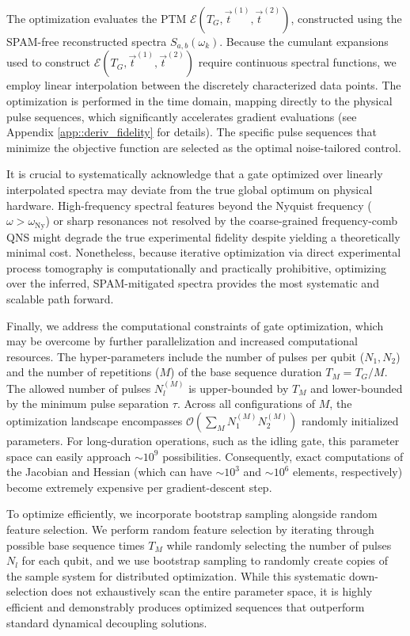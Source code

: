 \documentclass[%
 reprint,
superscriptaddress,
 amsmath,amssymb,
 aps,
pra,
floatfix,
]{revtex4-2}
\begin{document}
The optimization evaluates the PTM $\mathcal{E}(T_G, \vec{t}^{(1)}, \vec{t}^{(2)})$, constructed using the SPAM-free reconstructed spectra $S_{a,b}(\omega_k)$. Because the cumulant expansions used to construct $\mathcal{E}(T_G, \vec{t}^{(1)}, \vec{t}^{(2)})$ require continuous spectral functions, we employ linear interpolation between the discretely characterized data points. The optimization is performed in the time domain, mapping directly to the physical pulse sequences, which significantly accelerates gradient evaluations (see Appendix \ref{app::deriv_fidelity} for details). The specific pulse sequences that minimize the objective function are selected as the optimal noise-tailored control.

It is crucial to systematically acknowledge that a gate optimized over linearly interpolated spectra may deviate from the true global optimum on physical hardware. High-frequency spectral features beyond the Nyquist frequency ($\omega > \omega_{\text{Ny}}$) or sharp resonances not resolved by the coarse-grained frequency-comb QNS might degrade the true experimental fidelity despite yielding a theoretically minimal cost. Nonetheless, because iterative optimization via direct experimental process tomography is computationally and practically prohibitive, optimizing over the inferred, SPAM-mitigated spectra provides the most systematic and scalable path forward. 

Finally, we address the computational constraints of gate optimization, which may be overcome by further parallelization and increased computational resources. The hyper-parameters include the number of pulses per qubit ($N_1, N_2$) and the number of repetitions ($M$) of the base sequence duration $T_M = T_G/M$. The allowed number of pulses $N_l^{(M)}$ is upper-bounded by $T_M$ and lower-bounded by the minimum pulse separation $\tau$. Across all configurations of $M$, the optimization landscape encompasses $\mathcal{O}(\sum_M N_1^{(M)}N_2^{(M)})$ randomly initialized parameters. For long-duration operations, such as the idling gate, this parameter space can easily approach $\sim 10^9$ possibilities. Consequently, exact computations of the Jacobian and Hessian (which can have $\sim 10^3$ and $\sim 10^6$ elements, respectively) become extremely expensive per gradient-descent step. 

To optimize efficiently, we incorporate bootstrap sampling alongside random feature selection. We perform random feature selection by iterating through possible base sequence times $T_M$ while randomly selecting the number of pulses $N_l$ for each qubit, and we use bootstrap sampling to randomly create copies of the sample system for distributed optimization. While this systematic down-selection does not exhaustively scan the entire parameter space, it is highly efficient and demonstrably produces optimized sequences that outperform standard dynamical decoupling solutions. 
\end{document}
